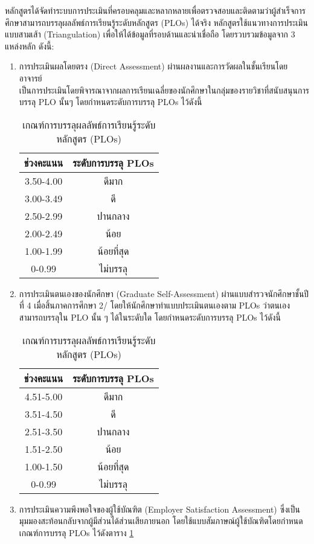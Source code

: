 หลักสูตรได้จัดทำระบบการประเมินที่ครอบคลุมและหลากหลายเพื่อตรวจสอบและติดตามว่าผู้สำเร็จการศึกษาสามารถบรรลุผลลัพธ์การเรียนรู้ระดับหลักสูตร (PLOs) ได้จริง หลักสูตรใช้แนวทางการประเมินแบบสามเส้า (Triangulation) เพื่อให้ได้ข้อมูลที่รอบด้านและน่าเชื่อถือ โดยรวบรวมข้อมูลจาก 3 แหล่งหลัก ดังนี้:
\begin{enumerate}
	\item การประเมินผลโดยตรง (Direct Assessment) ผ่านผลงานและการวัดผลในชั้นเรียนโดยอาจารย์\\
	เป็นการประเมินโดยพิจารณาจากผลการเรียนเฉลี่ยของนักศึกษาในกลุ่มของรายวิชาที่สนับสนุนการบรรลุ PLO นั้นๆ โดยกำหนดระดับการบรรลุ PLOs ไว้ดังนี้
	\begin{table}[h!]
	\caption{เกณฑ์การบรรลุผลลัพธ์การเรียนรู้ระดับหลักสูตร (PLOs)}
	\begin{center}
		\begin{tabular}{|c|c|}
			\hline
			\textbf{ช่วงคะแนน}&\textbf{ระดับการบรรลุ PLOs}\\\hline
		3.50-4.00&ดีมาก\\\hline
		3.00-3.49&ดี\\\hline
		2.50-2.99&ปานกลาง\\\hline
		2.00-2.49&น้อย\\\hline
		1.00-1.99&น้อยที่สุด\\\hline
	0-0.99&ไม่บรรลุ\\\hline
	\end{tabular}
	\end{center}
		\end{table}
	\item การประเมินตนเองของนักศึกษา (Graduate Self-Assessment) ผ่านแบบสำรวจนักศึกษาชั้นปีที่ 4 เมื่อสิ้นภาคการศึกษา 2/\printyear{}
	โดยให้นักศึกษาทำแบบประเมินตนเองตาม PLOs ว่าตนเองสามารถบรรลุใน PLO นั้น ๆ ได้ในระดับใด โดยกำหนดระดับการบรรลุ PLOs ไว้ดังนี้\\[-0.25cm]
		\begin{table}[h!]
		\caption{เกณฑ์การบรรลุผลลัพธ์การเรียนรู้ระดับหลักสูตร (PLOs)}
	\label{table:1.5}
	\begin{center}
	\begin{tabular}{|c|c|}
		\hline
		\textbf{ช่วงคะแนน}&\textbf{ระดับการบรรลุ PLOs}\\\hline
		4.51-5.00&ดีมาก\\\hline
		3.51-4.50&ดี\\\hline
		2.51-3.50&ปานกลาง\\\hline
		1.51-2.50&น้อย\\\hline
		1.00-1.50&น้อยที่สุด\\\hline
		0-0.99&ไม่บรรลุ\\\hline
	\end{tabular}
	\end{center}
	\end{table}
	\item การประเมินความพึงพอใจของผู้ใช้บัณฑิต (Employer Satisfaction Assessment) ซึ่งเป็นมุมมองสะท้อนกลับจากผู้มีส่วนได้ส่วนเสียภายนอก โดยใช้แบบสัมภาษณ์ผู้ใช้บัณฑิตโดยกำหนดเกณฑ์การบรรลุ PLOs ไว้ดังตาราง \ref{table:1.5}
\end{enumerate}

